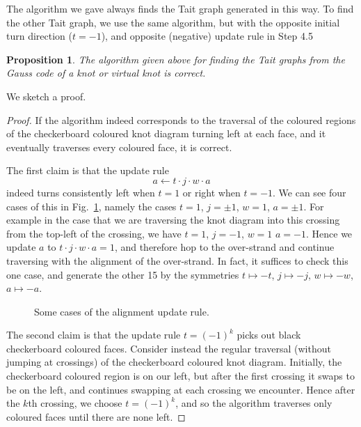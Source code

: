 \documentclass[12pt]{report}
\newtheorem*{proposition}{Proposition}
\theoremstyle{upright}
\begin{document}
The algorithm we gave always finds the Tait graph generated in this way. To find the other Tait graph, we use the same algorithm, but with the opposite initial turn direction ($t = -1$), and opposite (negative) update rule in Step 4.5

\begin{proposition}
	The algorithm given above for finding the Tait graphs from the Gauss code of a knot or virtual knot is correct.
\end{proposition}

We sketch a proof.

\begin{proof}

	If the algorithm indeed corresponds to the traversal of the coloured regions of the checkerboard coloured knot diagram turning left at each face, and it eventually traverses every coloured face, it is correct.
	
	The first claim is that the update rule
	\[a \leftarrow t \cdot j \cdot w \cdot a\]
	indeed turns consistently left when $t = 1$ or right when $t = -1$. We can see four cases of this in Fig.~\ref{fig:alignment-update-rule}, namely the cases $t = 1$, $j = \pm 1$, $w = 1$, $a = \pm 1$. For example in the case that we are traversing the knot diagram into this crossing from the top-left of the crossing, we have $t = 1$,  $j = -1$, $w = 1$ $a = -1$. Hence we update $a$ to $t \cdot j \cdot w \cdot a = 1$, and therefore hop to the over-strand and continue traversing with the alignment of the over-strand. In fact, it suffices to check this one case, and generate the other 15 by the symmetries $t \mapsto -t$, $j \mapsto -j$, $w \mapsto -w$, $a \mapsto -a$.
	
	\begin{figure}[hbt!]
		\centering
		\def\svgscale{0.3}
		
		
		\caption{Some cases of the alignment update rule.}
		\label{fig:alignment-update-rule}
	\end{figure}
	
	The second claim is that the update rule $t = (-1)^{k}$ picks out black checkerboard coloured faces. Consider instead the regular traversal (without jumping at crossings) of the checkerboard coloured knot diagram. Initially, the checkerboard coloured region is on our left, but after the first crossing it swaps to be on the left, and continues swapping at each crossing we encounter. Hence after the $k$th crossing, we choose $t = (-1)^{k}$, and so the algorithm traverses only coloured faces until there are none left. 
\end{proof}
\end{document}
